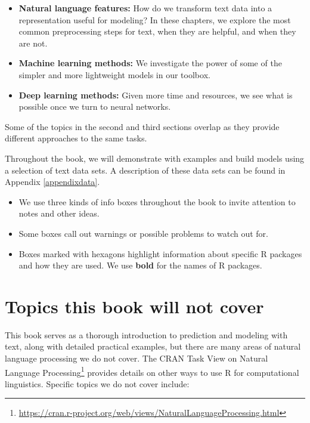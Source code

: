 \documentclass[
]{krantz}
\DeclareRobustCommand{\href}[2]{#2\footnote{\url{#1}}}
\renewcommand{\href}[2]{#2\footnote{\url{#1}}}
\newenvironment{rmdblock}[1]
  {\begin{shaded*}
  \begin{itemize}[left = -1cm, labelsep = 1cm]
  \renewcommand{\labelitemi}{
    \raisebox{-.7\height}[0pt][0pt]{
      {\setkeys{Gin}{width=3em,keepaspectratio}\texttt{[image: images/\#1]}}
    }
  }
 
  \item
  }
  {
  \end{itemize}
  \end{shaded*}
  }
\newenvironment{rmdnote}
  {\begin{rmdblock}{note}}
  {\end{rmdblock}}
\newenvironment{rmdwarning}
  {\begin{rmdblock}{warning}}
  {\end{rmdblock}}
\newenvironment{rmdpackage}
  {\begin{rmdblock}{package}}
  {\end{rmdblock}}
\begin{document}
\begin{itemize}
\item
  \textbf{Natural language features:} How do we transform text data into a representation useful for modeling? In these chapters, we explore the most common preprocessing steps for text, when they are helpful, and when they are not.
\item
  \textbf{Machine learning methods:} We investigate the power of some of the simpler and more lightweight models in our toolbox.
\item
  \textbf{Deep learning methods:} Given more time and resources, we see what is possible once we turn to neural networks.
\end{itemize}

Some of the topics in the second and third sections overlap as they provide different approaches to the same tasks.

Throughout the book, we will demonstrate with examples and build models using a selection of text data sets. A description of these data sets can be found in Appendix \ref{appendixdata}.

\begin{rmdnote}
We use three kinds of info boxes throughout the book to invite attention
to notes and other ideas.
\end{rmdnote}

\begin{rmdwarning}
Some boxes call out warnings or possible problems to watch out for.
\end{rmdwarning}

\begin{rmdpackage}
Boxes marked with hexagons highlight information about specific R
packages and how they are used. We use \textbf{bold} for the names of R
packages.
\end{rmdpackage}

\hypertarget{topics-this-book-will-not-cover}{%
\section*{Topics this book will not cover}\label{topics-this-book-will-not-cover}}


This book serves as a thorough introduction to prediction and modeling with text, along with detailed practical examples, but there are many areas of natural language processing we do not cover. The \href{https://cran.r-project.org/web/views/NaturalLanguageProcessing.html}{CRAN Task View on Natural Language Processing} provides details on other ways to use R for computational linguistics. Specific topics we do not cover include:
\end{document}
